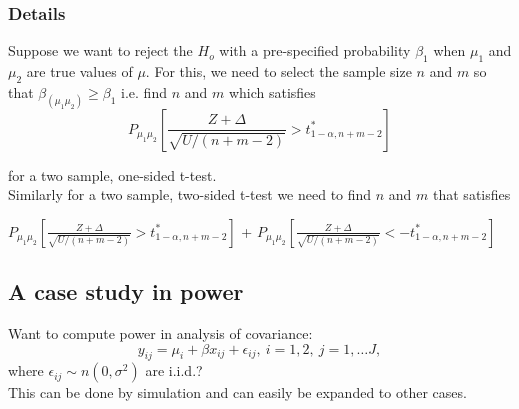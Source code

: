 \documentclass[12pt,a4paper]{article}
\theoremstyle{regla}
\theoremstyle{remark}
\theoremstyle{definition}
\theoremstyle{nonumberbreak}
\begin{document}
\subsubsection{Details}
Suppose we want to reject the $H_o$ with a pre-specified probability $\beta_1$ when $\mu_1$ and $\mu_2$ are true values of $\mu$. For this, we need to select the sample size $n$ and $m$ so that $\beta_(\mu_1\mu_2) \geq \beta_1$ i.e. find $n$ and $m$ which satisfies 
$$ P_{\mu_1\mu_2} \left[ \frac{Z + \Delta}{\sqrt{U/(n+m-2)}} > t^\ast_{1-\alpha,n+m-2} \right] $$

 
for a two sample, one-sided t-test. \\

Similarly for a two sample, two-sided t-test we need to find $n$ and $m$ that satisfies 

$ P_{\mu_1\mu_2}\left[ \frac{Z + \Delta}{\sqrt{U/(n+m-2)}} > t^\ast_{1-\alpha,n+m-2} \right]$ +
$ P_{\mu_1\mu_2} \left[\frac{Z + \Delta}{\sqrt{U/(n+m-2)}} < -t^\ast_{1-\alpha,n+m-2} \right]$



\subsection{A case study in power}
\begin{fbox}
\begin{minipage}{0.97\textwidth}
Want to compute power in analysis of covariance:
$$
y_{ij}=\mu_i+\beta x_{ij}+\epsilon_{ij} , \ i=1, 2,\ j=1,\ldots J,
$$
where $\epsilon_{ij}\sim n(0,\sigma^ 2)$ are i.i.d.?\\

This can be done by simulation and can easily be expanded to other cases.


\end{minipage}
\end{fbox}
\end{document}
